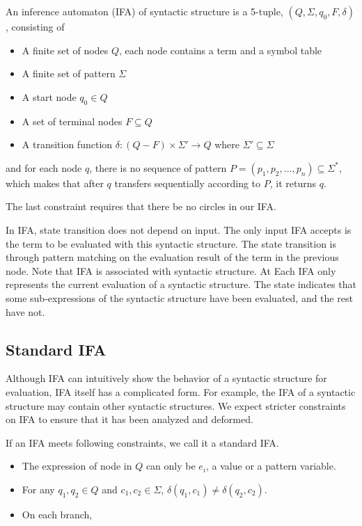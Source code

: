 \begin{Def}

An inference automaton (IFA) of syntactic structure  is a 5-tuple, $(Q, \Sigma, q_0, F, \delta)$, consisting of

\begin{itemize}
    \item A finite set of nodes $Q$, each node contains a term and a symbol table
    \item A finite set of pattern $\Sigma$
    \item A start node $q_0 \in Q$
    \item A set of terminal nodes $F \subseteq Q$
    \item A transition function $\delta: (Q-F) \times \Sigma' \to Q$ where $\Sigma' \subseteq \Sigma$
\end{itemize}

and for each node $q$, there is no sequence of pattern $P = (p_1,p_2,\ldots,p_n)\subseteq \Sigma^*$, which makes that after $q$ transfers sequentially according to $P$, it returns $q$.

\end{Def}

The last constraint requires that there be no circles in our IFA.

In IFA, state transition does not depend on input. The only input IFA accepts is the term to be evaluated with this syntactic structure. The state transition is through pattern matching on the evaluation result of the term in the previous node. Note that IFA is associated with syntactic structure. At Each IFA only represents the current evaluation of a syntactic structure. The state indicates that some
sub-expressions of the syntactic structure have been evaluated, and the rest have not.

\subsection{Standard IFA}

Although IFA can intuitively show the behavior of a syntactic structure for evaluation, IFA itself has a complicated form. For example, the IFA of a syntactic structure may contain other syntactic structures. We expect stricter constraints on IFA to ensure that it has been analyzed and deformed.

\begin{Def}
\label{def:stdifa}
If an IFA meets following constraints, we call it a standard IFA.
\begin{itemize}
    \item The expression of node in $Q$ can only be $e_i$, a value or a pattern variable.
    \item For any $q_1,q_2 \in Q$ and $c_1, c_2 \in \Sigma$, $\delta(q_1, c_1) \neq \delta(q_2, c_2)$.
    \item On each branch,
\end{itemize}
\end{Def}

